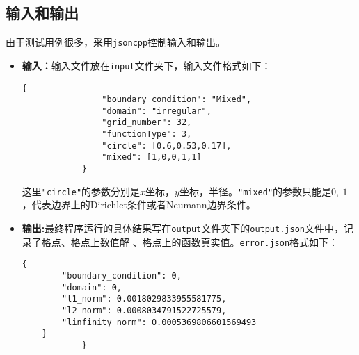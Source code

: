 \documentclass[UTF8]{ctexart}
\begin{document}
	\subsection{输入和输出}
	由于测试用例很多，采用\texttt{jsoncpp}控制输入和输出。
	\begin{itemize}
		\item  \textbf{输入：}输入文件放在\texttt{input}文件夹下，输入文件格式如下：
		\begin{lstlisting}[style=json]
			{
				"boundary_condition": "Mixed",
				"domain": "irregular",
				"grid_number": 32,
				"functionType": 3,
				"circle": [0.6,0.53,0.17],
				"mixed": [1,0,0,1,1]
			}
		\end{lstlisting}
		这里\texttt{"circle"}的参数分别是$x$坐标，$y$坐标，半径。\texttt{"mixed"}的参数只能是$0,\ 1$，代表边界上的Dirichlet条件或者Neumann边界条件。
		\item \textbf{输出:}最终程序运行的具体结果写在\texttt{output}文件夹下的\texttt{output.json}文件中，记录了格点、格点上数值解 、格点上的函数真实值。\texttt{error.json}格式如下：
				\begin{lstlisting}[style=json]
	{
		"boundary_condition": 0,
		"domain": 0,
		"l1_norm": 0.0018029833955581775,
		"l2_norm": 0.0008034791522725579,
		"linfinity_norm": 0.0005369806601569493
	}
			}
		\end{lstlisting}
	\end{itemize}

	
\end{document}
